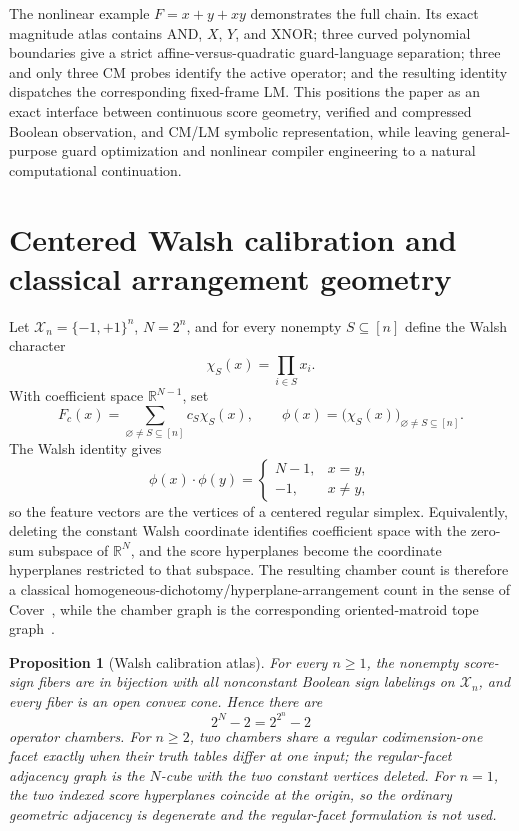 \documentclass[11pt]{article}
\newtheorem{proposition}[theorem]{Proposition}
\theoremstyle{definition}
\theoremstyle{remark}
\newcommand{\R}{\mathbb{R}}
\begin{document}
The nonlinear example $F=x+y+xy$ demonstrates the full chain. Its exact magnitude atlas contains AND, $X$, $Y$, and XNOR; three curved polynomial boundaries give a strict affine-versus-quadratic guard-language separation; three and only three CM probes identify the active operator; and the resulting identity dispatches the corresponding fixed-frame LM. This positions the paper as an exact interface between continuous score geometry, verified and compressed Boolean observation, and CM/LM symbolic representation, while leaving general-purpose guard optimization and nonlinear compiler engineering to a natural computational continuation.

\appendix
\section{Centered Walsh calibration and classical arrangement geometry}\label{app:walsh}

Let $\mathcal X_n=\{-1,+1\}^n$, $N=2^n$, and for every nonempty $S\subseteq[n]$ define the Walsh character
\[
 \chi_S(x)=\prod_{i\in S}x_i.
\]
With coefficient space $\R^{N-1}$, set
\[
 F_c(x)=\sum_{\varnothing\ne S\subseteq[n]}c_S\chi_S(x),
 \qquad
 \phi(x)=\bigl(\chi_S(x)\bigr)_{\varnothing\ne S\subseteq[n]}.
\]
The Walsh identity gives
\[
 \phi(x)\cdot\phi(y)=
 \begin{cases}N-1,&x=y,\\-1,&x\ne y,\end{cases}
\]
so the feature vectors are the vertices of a centered regular simplex. Equivalently, deleting the constant Walsh coordinate identifies coefficient space with the zero-sum subspace of $\R^N$, and the score hyperplanes become the coordinate hyperplanes restricted to that subspace. The resulting chamber count is therefore a classical homogeneous-dichotomy/hyperplane-arrangement count in the sense of Cover~\cite{Cover1965}, while the chamber graph is the corresponding oriented-matroid tope graph~\cite{BjornerEtAl1999}.

\begin{proposition}[Walsh calibration atlas]\label{prop:walshcalibration}
For every $n\ge1$, the nonempty score-sign fibers are in bijection with all nonconstant Boolean sign labelings on $\mathcal X_n$, and every fiber is an open convex cone. Hence there are
\[
 2^N-2=2^{2^n}-2
\]
operator chambers. For $n\ge2$, two chambers share a regular codimension-one facet exactly when their truth tables differ at one input; the regular-facet adjacency graph is the $N$-cube with the two constant vertices deleted. For $n=1$, the two indexed score hyperplanes coincide at the origin, so the ordinary geometric adjacency is degenerate and the regular-facet formulation is not used.
\end{proposition}
\end{document}
